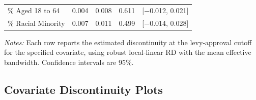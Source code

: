 \begin{table}[!h]
\begin{tabularx}{\textwidth}{p{5cm}rccc}
        \% Aged 18 to 64                              &   0.004  & 0.008 & 0.611 & [$-$0.012, 0.021] \\
        \% Racial Minority                            &   0.007  & 0.011 & 0.499 & [$-$0.014, 0.028] \\
        \hline
    \end{tabularx}
    \begin{tablenotes}[flushleft]
        \small
        \item \textit{Notes:} Each row reports the estimated discontinuity at the levy‐approval cutoff for the specified covariate, using robust local‐linear RD with the mean effective bandwidth. Confidence intervals are 95\%.  
    \end{tablenotes}
\end{table}


\subsection{Covariate Discontinuity Plots}


